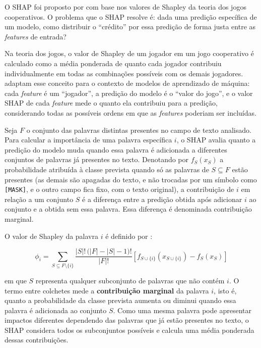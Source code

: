 \documentclass[
    12pt,                %
    openright,           %
    oneside,             %
    a4paper,             %
    english,             %
    brazil               %
]{abntex2}
\begin{document}
O SHAP foi proposto por  com base nos valores 
de Shapley da teoria dos jogos cooperativos. O problema que o SHAP 
resolve é: dada uma predição específica de um modelo, como distribuir 
o ``crédito'' por essa predição de forma justa entre as 
\textit{features} de entrada?

Na teoria dos jogos, o valor de Shapley de um jogador em um jogo 
cooperativo é calculado como a média ponderada de quanto cada jogador 
contribuiu individualmente em todas as combinações possíveis com os 
demais jogadores.  adaptam esse conceito 
para o contexto de modelos de aprendizado de máquina: cada 
\textit{feature} é um ``jogador'', a predição do modelo é o 
``valor do jogo'', e o valor SHAP de cada \textit{feature} mede 
o quanto ela contribuiu para a predição, considerando todas as 
possíveis ordens em que as \textit{features} poderiam ser incluídas.

Seja $F$ o conjunto das palavras distintas presentes no campo de texto analisado. Para calcular a importância de uma palavra específica $i$, o SHAP avalia quanto a predição do modelo muda quando essa palavra é adicionada a diferentes conjuntos de palavras já presentes no texto. Denotando por $f_S(x_S)$ a probabilidade atribuída à classe prevista quando só as palavras de $S \subseteq F$ estão presentes (as demais são apagadas do texto, e não trocadas por um símbolo como \texttt{[MASK]}, e o outro campo fica fixo, com o texto original), a contribuição de $i$ em relação a um conjunto $S$ é a diferença entre a predição obtida após adicionar $i$ ao conjunto e a obtida sem essa palavra. Essa diferença é denominada contribuição marginal.

O valor de Shapley da palavra $i$ é definido por \cite{lundberg2017}:

\begin{equation}
\phi_i = \sum_{S \subseteq F \setminus \{i\}}
\frac{|S|!\,\big(|F| - |S| - 1\big)!}{|F|!}
\left[ f_{S \cup \{i\}}(x_{S \cup \{i\}}) - f_S(x_S) \right]
\label{eq:shapley}
\end{equation}

em que $S$ representa qualquer subconjunto de palavras que não contém $i$. O termo entre colchetes mede a \textbf{contribuição marginal} da palavra $i$, isto é, quanto a probabilidade da classe prevista aumenta ou diminui quando essa palavra é adicionada ao conjunto $S$. Como uma mesma palavra pode apresentar impactos diferentes dependendo das palavras que já estão presentes no texto, o SHAP considera todos os subconjuntos possíveis e calcula uma média ponderada dessas contribuições.
\end{document}
